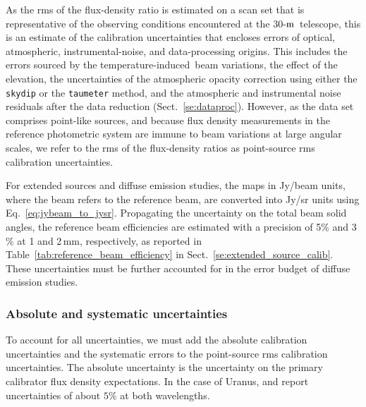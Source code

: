 \documentclass[traditionalabstract]{aa}
\newcommand{\afternoon}{temperature-induced}
\newcommand{\trentemetre}{30-$\rm{m}$}
\newcommand{\lp}[1]{#1}
\newcommand{\rev}[1]{#1}
\begin{document}
{{\lp As the rms of the flux-density ratio is estimated on a scan set
that is representative of the observing conditions encountered at
the \trentemetre\ telescope, this is an estimate of the
calibration uncertainties that encloses errors of
optical, atmospheric, instrumental-noise, and data-processing
origins. This includes the errors sourced by the \afternoon\ beam 
variations, the effect of the elevation, the uncertainties of the
atmospheric opacity correction using either the {\tt skydip} or
the {\tt taumeter} method, and the atmospheric and instrumental noise
residuals after the data reduction (Sect.~\ref{se:dataproc}). {\rev
However, as the data set comprises point-like sources, and because flux
density measurements in the reference photometric system are immune to
beam variations at large angular scales, we refer to the rms of the
flux-density ratios as point-source rms calibration uncertainties.}

{\rev For extended sources and diffuse emission studies, the maps in
Jy/beam units, where the beam refers to the reference beam, are
converted into Jy/sr units using
Eq.~\ref{eq:jybeam_to_jysr}. Propagating the uncertainty on the
total beam solid angles, the reference beam efficiencies are estimated
with a precision of 5$\%$ and 3$\%$ at 1 and 2\,mm,
respectively, as reported in Table~\ref{tab:reference_beam_efficiency}
in Sect.~\ref{se:extended_source_calib}. These uncertainties must be
further accounted for in the error budget of diffuse emission studies.}


\subsubsection{Absolute and systematic uncertainties}
\label{se:def_systematic_errors}

To account for all uncertainties, we must add the absolute calibration
uncertainties and the systematic errors to the {\rev
point-source} rms calibration uncertainties. The absolute uncertainty is
the uncertainty on the primary calibrator flux density expectations. 
In the case of Uranus, \citet{Morenothesis} and \citet{Bendo2013} report 
uncertainties of about $5\%$ at both wavelengths.

}}
\end{document}
